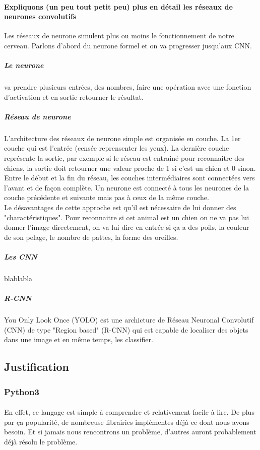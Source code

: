 \documentclass[a4paper]{article}
\begin{document}
				\paragraph{Expliquons (un peu tout petit peu) plus en détail les réseaux de neurones convolutifs}
					Les réseaux de neurone simulent plus ou moins le fonctionnement de notre cerveau. Parlons d'abord du neurone formel et on va progresser jusqu'aux CNN.
					\subparagraph{Le neurone} va prendre plusieurs entrées, des nombres, faire une opération avec une fonction d'activation et en sortie retourner le résultat.
					\subparagraph{Réseau de neurone} L'architecture des réseaux de neurone simple est organisée en couche. La 1er couche qui est l'entrée (censée reprensenter les yeux).
						La dernière couche représente la sortie, par exemple si le réseau est entrainé pour reconnaitre des chiens, la sortie doit retourner une valeur proche de 1 si c'est un chien et 0 sinon.
						Entre le début et la fin du réseau, les couches intermédiaires sont connectées vers l'avant et de façon complète. Un neurone est connecté à tous les neurones de la couche précédente et suivante mais pas à ceux de la même couche.
					\\Le désavantages de cette approche est qu'il est nécessaire de lui donner des "charactéristiques". Pour reconnaitre si cet animal est un chien on ne va pas lui donner l'image directement, on va lui dire en entrée si ça a des poils, la couleur de son pelage, le nombre de pattes, la forme des oreilles.
					\subparagraph{Les CNN} blablabla
					\subparagraph{R-CNN}
				\paragraph{}
					You Only Look Once (YOLO) est une archicture de Réseau Neuronal Convolutif (CNN) de type "Region based" (R-CNN) qui est capable de localiser des objets dans une image et en même temps, les classifier.
		\subsection*{Justification}
			\subsubsection*{Python3}
				\paragraph{} En effet, ce langage est simple à comprendre et relativement facile à lire. De plus par ça popularité, de nombreuse librairies implémentes déjà ce dont nous avons besoin. Et si jamais nous rencontrons un problème, d'autres auront probablement déjà résolu le problème.
\end{document}
